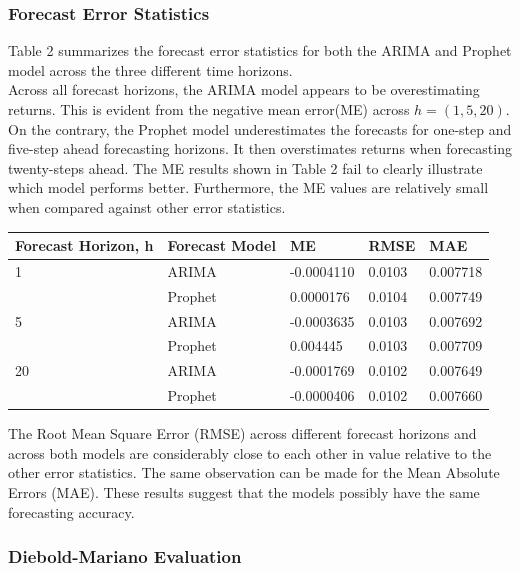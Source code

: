 \documentclass[12pt,a4paper]{article}
\numberwithin{equation}{section}
\numberwithin{figure}{section}
\numberwithin{table}{section}
\let\origtable\table
\let\endorigtable\endtable
\renewenvironment{table}[1][2] {
    \expandafter\origtable\expandafter[H]
} {
    \endorigtable
}
\begin{document}
\subsubsection{Forecast Error
Statistics}\label{forecast-error-statistics}

Table 2 summarizes the forecast error statistics for both the ARIMA and
Prophet model across the three different time horizons.\\
Across all forecast horizons, the ARIMA model appears to be
overestimating returns. This is evident from the negative mean error(ME)
across \(h = (1,5,20)\). On the contrary, the Prophet model
underestimates the forecasts for one-step and five-step ahead
forecasting horizons. It then overstimates returns when forecasting
twenty-steps ahead. The ME results shown in Table 2 fail to clearly
illustrate which model performs better. Furthermore, the ME values are
relatively small when compared against other error statistics.

\begin{table}[H]
\centering
\begin{tabular}{lllll}
  \hline
Forecast Horizon, h & Forecast Model &  ME  & RMSE & MAE \\ 
  \hline
1 & ARIMA & -0.0004110 & 0.0103 & 0.007718 \\ 
    & Prophet & 0.0000176 & 0.0104 & 0.007749 \\ 
  5 & ARIMA & -0.0003635 & 0.0103 & 0.007692 \\ 
    & Prophet & 0.004445 & 0.0103 & 0.007709 \\ 
  20 & ARIMA & -0.0001769 & 0.0102 & 0.007649 \\ 
    & Prophet & -0.0000406 & 0.0102 & 0.007660 \\ 
   \hline
\end{tabular}
\caption{Forecast error diagnostic statistics over different forecasting horizons} 
\end{table}

The Root Mean Square Error (RMSE) across different forecast horizons and
across both models are considerably close to each other in value
relative to the other error statistics. The same observation can be made
for the Mean Absolute Errors (MAE). These results suggest that the
models possibly have the same forecasting accuracy.

\subsubsection{Diebold-Mariano
Evaluation}\label{diebold-mariano-evaluation-1}
\end{document}
